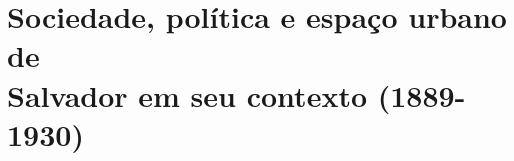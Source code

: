 \chapter[Sociedade, política e espaço urbano de Salvador em seu contexto (1889-1930)]{Sociedade, política e espaço urbano de \\Salvador em seu contexto (1889-1930)}\label{cap:1}





